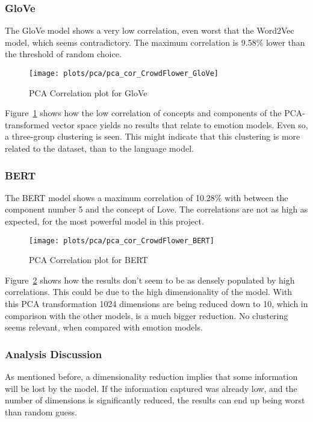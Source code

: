 \subsubsection{GloVe}
The GloVe model shows a very low correlation, even worst that the Word2Vec model, which seems contradictory. The maximum correlation is 9.58\% lower than the threshold of random choice.
\begin{figure}[H]
  \texttt{[image: plots/pca/pca\_cor\_CrowdFlower\_GloVe]}
  \centering
  \caption{PCA Correlation plot for GloVe}\label{fig:pca_cor_CrowdFlower_GloVe}
\end{figure}
Figure~\ref{fig:pca_cor_CrowdFlower_GloVe} shows how the low correlation of concepts and components of the PCA-transformed vector space yields no results that relate to emotion models. Even so, a three-group clustering is seen. This might indicate that this clustering is more related to the dataset, than to the language model.

\subsubsection{BERT}
The BERT model shows a maximum correlation of 10.28\% with between the component number 5 and the concept of Love. The correlations are not as high as expected, for the most powerful model in this project.
\begin{figure}[H]
  \texttt{[image: plots/pca/pca\_cor\_CrowdFlower\_BERT]}
  \centering
  \caption{PCA Correlation plot for BERT}\label{fig:pca_cor_CrowdFlower_BERT}
\end{figure}
Figure~\ref{fig:pca_cor_CrowdFlower_BERT} shows how the results don't seem to be as densely populated by high correlations. This could be due to the high dimensionality of the model. With this PCA transformation 1024 dimensions are being reduced down to 10, which in comparison with the other models, is a much bigger reduction. No clustering seems relevant, when compared with emotion models.

\subsubsection{Analysis Discussion}
As mentioned before, a dimensionality reduction implies that some information will be lost by the model. If the information captured was already low, and the number of dimensions is significantly reduced, the results can end up being worst than random guess.

